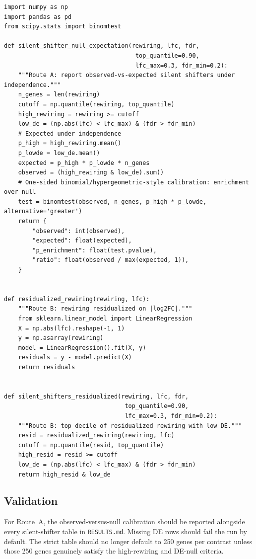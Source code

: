 \documentclass[11pt]{article}
\newcommand{\code}[1]{\texttt{#1}}
\begin{document}
\begin{lstlisting}[style=pythonstyle,caption={Silent-shifter null calibration (Route A) and residualization (Route B).}]
import numpy as np
import pandas as pd
from scipy.stats import binomtest

def silent_shifter_null_expectation(rewiring, lfc, fdr,
                                     top_quantile=0.90,
                                     lfc_max=0.3, fdr_min=0.2):
    """Route A: report observed-vs-expected silent shifters under independence."""
    n_genes = len(rewiring)
    cutoff = np.quantile(rewiring, top_quantile)
    high_rewiring = rewiring >= cutoff
    low_de = (np.abs(lfc) < lfc_max) & (fdr > fdr_min)
    # Expected under independence
    p_high = high_rewiring.mean()
    p_lowde = low_de.mean()
    expected = p_high * p_lowde * n_genes
    observed = (high_rewiring & low_de).sum()
    # One-sided binomial/hypergeometric-style calibration: enrichment over null
    test = binomtest(observed, n_genes, p_high * p_lowde, alternative='greater')
    return {
        "observed": int(observed),
        "expected": float(expected),
        "p_enrichment": float(test.pvalue),
        "ratio": float(observed / max(expected, 1)),
    }


def residualized_rewiring(rewiring, lfc):
    """Route B: rewiring residualized on |log2FC|."""
    from sklearn.linear_model import LinearRegression
    X = np.abs(lfc).reshape(-1, 1)
    y = np.asarray(rewiring)
    model = LinearRegression().fit(X, y)
    residuals = y - model.predict(X)
    return residuals


def silent_shifters_residualized(rewiring, lfc, fdr,
                                  top_quantile=0.90,
                                  lfc_max=0.3, fdr_min=0.2):
    """Route B: top decile of residualized rewiring with low DE."""
    resid = residualized_rewiring(rewiring, lfc)
    cutoff = np.quantile(resid, top_quantile)
    high_resid = resid >= cutoff
    low_de = (np.abs(lfc) < lfc_max) & (fdr > fdr_min)
    return high_resid & low_de
\end{lstlisting}

\subsection{Validation}

For Route~A, the observed-versus-null calibration should be reported alongside every silent-shifter table in \code{RESULTS.md}. Missing DE rows should fail the run by default. The strict table should no longer default to 250 genes per contrast unless those 250 genes genuinely satisfy the high-rewiring and DE-null criteria.
\end{document}
